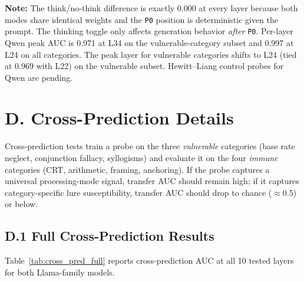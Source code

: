 \documentclass{article}
\newcommand{\pzero}{\texttt{P0}}
\begin{document}
\noindent \textbf{Note:} The think/no-think difference is exactly
0.000 at every layer because both modes share identical weights and
the \pzero{} position is deterministic given the prompt.  The thinking
toggle only affects generation behavior \emph{after} \pzero{}.  Per-layer
Qwen peak AUC is 0.971 at L34 on the vulnerable-category subset and
0.997 at L24 on all categories.  The peak layer for vulnerable categories
shifts to L24 (tied at 0.969 with L22) on the vulnerable subset.
Hewitt--Liang control probes for Qwen are pending.


\section*{D. Cross-Prediction Details}
\label{sec:appendix_cross}

Cross-prediction tests train a probe on the three \emph{vulnerable}
categories (base rate neglect, conjunction fallacy, syllogisms) and
evaluate it on the four \emph{immune} categories (CRT, arithmetic,
framing, anchoring).  If the probe captures a universal
processing-mode signal, transfer AUC should remain high; if it
captures category-specific lure susceptibility, transfer AUC should
drop to chance ($\approx$0.5) or below.

\subsection*{D.1 Full Cross-Prediction Results}

Table~\ref{tab:cross_pred_full} reports cross-prediction AUC at all
10 tested layers for both Llama-family models.
\end{document}
